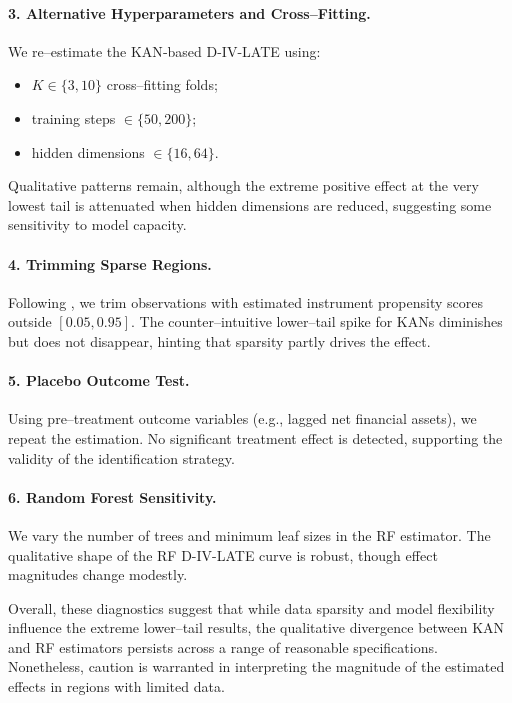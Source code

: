 \documentclass[final,3p,fleqn, 10pt]{elsarticle}
\begin{document}
\paragraph{3. Alternative Hyperparameters and Cross–Fitting.} We re–estimate the KAN‐based D-IV-LATE using:
\begin{itemize}
  \item $K \in \{3,10\}$ cross–fitting folds;
  \item training steps $\in \{50,200\}$;
  \item hidden dimensions $\in \{16,64\}$.
\end{itemize}
Qualitative patterns remain, although the extreme positive effect at the very lowest tail is attenuated when hidden dimensions are reduced, suggesting some sensitivity to model capacity.

\paragraph{4. Trimming Sparse Regions.} Following \citet{imbens2003trimming}, we trim observations with estimated instrument propensity scores outside $[0.05,0.95]$. The counter–intuitive lower–tail spike for KANs diminishes but does not disappear, hinting that sparsity partly drives the effect.

\paragraph{5. Placebo Outcome Test.} Using pre–treatment outcome variables (e.g., lagged net financial assets), we repeat the estimation. No significant treatment effect is detected, supporting the validity of the identification strategy.

\paragraph{6. Random Forest Sensitivity.} We vary the number of trees and minimum leaf sizes in the RF estimator. The qualitative shape of the RF D-IV-LATE curve is robust, though effect magnitudes change modestly.

Overall, these diagnostics suggest that while data sparsity and model flexibility influence the extreme lower–tail results, the qualitative divergence between KAN and RF estimators persists across a range of reasonable specifications. Nonetheless, caution is warranted in interpreting the magnitude of the estimated effects in regions with limited data.
\end{document}
